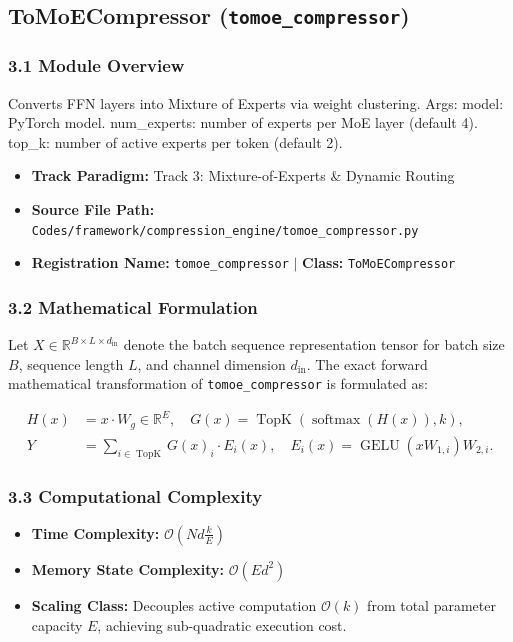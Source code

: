 \subsection{ToMoECompressor (\texttt{tomoe\_compressor})}
\label{sec:app_module_tomoe_compressor}

\subsubsection*{3.1 Module Overview}
Converts FFN layers into Mixture of Experts via weight clustering.  Args:     model: PyTorch model.     num\_experts: number of experts per MoE layer (default 4).     top\_k: number of active experts per token (default 2).
\begin{itemize}
    \item \textbf{Track Paradigm:} Track 3: Mixture-of-Experts & Dynamic Routing
    \item \textbf{Source File Path:} \texttt{Codes/framework/compression\_engine/tomoe\_compressor.py}
    \item \textbf{Registration Name:} \texttt{tomoe\_compressor} $\mid$ \textbf{Class:} \texttt{ToMoECompressor}
\end{itemize}

\subsubsection*{3.2 Mathematical Formulation}
Let $X \in \mathbb{R}^{B \times L \times d_{\text{in}}}$ denote the batch sequence representation tensor for batch size $B$, sequence length $L$, and channel dimension $d_{\text{in}}$. The exact forward mathematical transformation of \texttt{tomoe\_compressor} is formulated as:

\begin{align}
H(x) &= x \cdot W_g \in \mathbb{R}^{E}, \quad G(x) = \operatorname{TopK}\left(\operatorname{softmax}(H(x)), k\right), \\
Y &= \sum_{i \in \operatorname{TopK}} G(x)_i \cdot E_i(x), \quad E_i(x) = \operatorname{GELU}(x W_{1, i}) W_{2, i}.
\end{align}


\subsubsection*{3.3 Computational Complexity}
\begin{itemize}
    \item \textbf{Time Complexity:} $\mathcal{O}(N d \frac{k}{E})$
    \item \textbf{Memory State Complexity:} $\mathcal{O}(E d^2)$
    \item \textbf{Scaling Class:} Decouples active computation $\mathcal{O}(k)$ from total parameter capacity $E$, achieving sub-quadratic execution cost.
\end{itemize}

